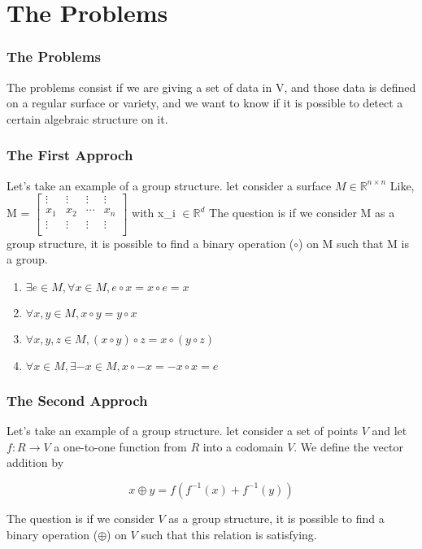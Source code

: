 \documentclass[11pt]{beamer}
\begin{document}


\section{The Problems}
\begin{frame}
    \frametitle{The Problems}
    The problems consist if we are giving a set of data in V, and those data is defined on a regular surface or variety, and we want to know if it is possible to detect a certain algebraic structure on it.
\end{frame}
\begin{frame}
		\frametitle{The First Approch}
	Let's take an example of a group structure.
	let consider a surface $M \in \mathbb{R}^{n \times n}$
	Like, 
	M = 
	$\begin{bmatrix}
		\vdots & \vdots & \vdots &\vdots \\
		x_{1} & x_{2} & \cdots & x_{n} \\
		\vdots & \vdots & \vdots &\vdots \\
	\end{bmatrix}$
	with x_{i} $\in \mathbb{R}^{d}$
	The question is if we consider M as a group structure, it is possible to find a binary operation ($\circ$) on M such that M is a group.
	\begin{enumerate}
		\item $\exists e \in M, \forall x \in M, e \circ x = x \circ e = x$
		\item $\forall{} x,y \in{} M, x \circ y = y \circ x$
		\item $\forall x,y,z \in M, (x \circ y) \circ z = x \circ (y \circ z)$
		\item $\forall x \in M, \exists -x \in M, x \circ -x = -x \circ x = e$
	\end{enumerate}
\end{frame}







\begin{frame}
    \frametitle{The Second Approch}
	Let's take an example of a group structure.
	let consider a set of points  $ V $ and let  $ f: R \rightarrow V $ a one-to-one
	function from $R$ into a codomain $V$. We define the vector addition by
	
     $$ x \oplus y = f(f^{-1}(x) + f^{-1}(y)) $$
		


	The question is if we consider $V$ as a group structure, it is possible to find a binary operation ($\oplus$) on $V$ such that this relation is satisfying.
	
\end{frame}
\end{document}
